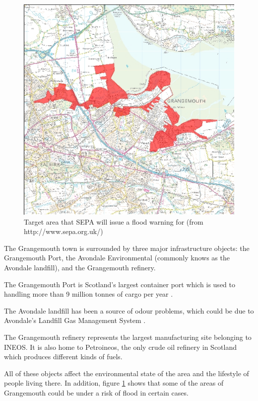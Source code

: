\begin{figure}
    \centering
    \includegraphics[width=\textwidth]{data/grangemouthflooding}
    \caption{Target area that SEPA will issue a flood warning for (from http://www.sepa.org.uk/)}
    \label{fig:grangemouthflooding}
\end{figure}

The Grangemouth town is surrounded by three major infrastructure objects: the Grangemouth Port, the Avondale Environmental (commonly knows as the Avondale landfill), and the Grangemouth refinery. 

The Grangemouth Port is Scotland's largest container port which is used to handling more than 9 million tonnes of cargo per year \cite{port}. 

The Avondale landfill has been a source of odour problems, which could be due to Avondale's Landfill Gas Management System \cite{fhavondale}. 

The Grangemouth refinery represents the largest manufacturing site belonging to INEOS. It is also home to Petroineos, the only crude oil refinery in Scotland which produces different kinds of fuels. 

All of these objects affect the environmental state of the area and the lifestyle of people living there. In addition, figure \ref{fig:grangemouthflooding} shows that some of the areas of Grangemouth could be under a risk of flood in certain cases. 

